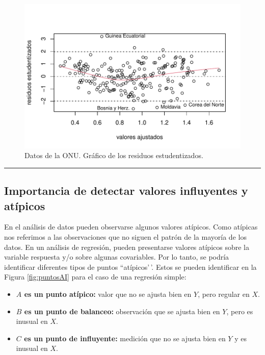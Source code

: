 \documentclass[
]{article}
\providecommand{\tightlist}{%
  \setlength{\itemsep}{0pt}\setlength{\parskip}{0pt}}
\begin{document}
\begin{figure}

{\centering \includegraphics{MLG1_files/figure-latex/Un11resFig-1} 

}

\caption{Datos de la ONU. Gráfico de los residuos estudentizados.}\label{fig:Un11resFig}
\end{figure}
\rule{\textwidth}{0.4pt}

\hypertarget{importancia-de-detectar-valores-influyentes-y-atuxedpicos}{%
\subsection{Importancia de detectar valores influyentes y atípicos}\label{importancia-de-detectar-valores-influyentes-y-atuxedpicos}}

En el análisis de datos pueden observarse algunos valores atípicos. Como atípicas nos referimos a las observaciones que no siguen el patrón de la mayoría de los datos. En un análisis de regresión, pueden presentarse valores atípicos sobre la variable respuesta y/o sobre algunas covariables. Por lo tanto, se podría identificar diferentes tipos de puntos ``atípicos'\,'. Estos se pueden identificar en la Figura \ref{fig:puntosAI} para el caso de una regresión simple:

\begin{itemize}
\tightlist
\item
  \textbf{\(A\) es un punto atípico:} valor que no se ajusta bien en \(Y\), pero regular en \(X\).
\item
  \textbf{\(B\) es un punto de balanceo:} observación que se ajusta bien en \(Y\), pero es inusual en \(X\).
\item
  \textbf{\(C\) es un punto de influyente:} medición que no se ajusta bien en \(Y\) y es inusual en \(X\).
\end{itemize}
\end{document}
